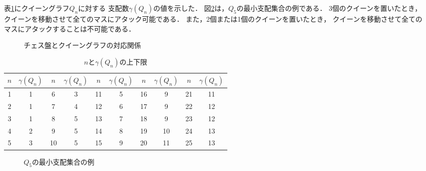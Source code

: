 表\ref{tb:queen_n}にクイーングラフ$Q_n$に対する
支配数$\gamma(Q_n)$の値を示した．
図\ref{ex:queengraph5}は，$Q_5$の最小支配集合の例である．
3個のクイーンを置いたとき，
クイーンを移動させて全てのマスにアタック可能である．
また，2個または1個のクイーンを置いたとき，
クイーンを移動させて全てのマスにアタックすることは不可能である．

\begin{figure}[htb]
 \begin{minipage}[b]{0.35\linewidth}
  \centering
  
 \end{minipage} 
 \begin{minipage}[b]{0.2\linewidth}
  \centering
  
 \end{minipage}
 \begin{minipage}[b]{0.35\linewidth}
  \centering
  
 \end{minipage}
 \caption{チェス盤とクイーングラフの対応関係}
 \label{ex:queengraph_3}
\end{figure}

\begin{table}[hbtp]
   \centering
   \caption{$n$と$\gamma(Q_n)$の上下限}
   \begin{tabular}{c|c||c|c||c|c||c|c||c|c} \hline
    $n$ & $\gamma(Q_{n})$ & $n$ & $\gamma(Q_{n})$ &$n$ & $\gamma(Q_{n})$ &$n$ & $\gamma(Q_{n})$ &$n$ & $\gamma(Q_{n})$ \\ \hline \hline
    1 &1 &6 &3 &11 &5 &16 &9 &21 &11\\ \hline
    2 &1 &7 &4 &12 &6 &17 &9 &22 &12\\ \hline
    3 &1 &8 &5 &13 &7 &18 &9 &23 &12\\ \hline
    4 &2 &9 &5 &14 &8 &19 &10 &24 &13\\ \hline
    5 &3 &10 &5 &15 &9 &20 &11 &25 &13\\ \hline
   \end{tabular}
   \label{tb:queen_n}
  \end{table}


\begin{figure}[htb]
  \centering
  
  \caption{$Q_5$の最小支配集合の例}
  \label{ex:queengraph5}
\end{figure}

